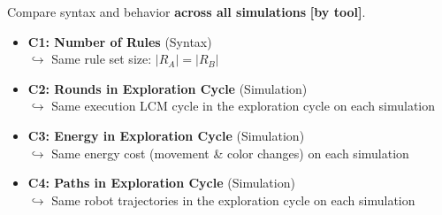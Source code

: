 \begin{frame}{}

\vspace{0.2cm}Compare syntax and behavior \textbf{across all simulations }\textbf{\textcolor{accent}{\scriptsize [by tool]}}.
\vspace{0.4cm}

\begin{itemize}\small\setlength\itemsep{0.15cm}
    \item<1-> \textbf{C1: Number of Rules} \textcolor{softgray}{\scriptsize (Syntax)}\\
              \textcolor{accent}{\scriptsize $\hookrightarrow$ Same rule set size: $|R_A| = |R_B|$}
              
    \item<2-> \textbf{C2: Rounds in Exploration Cycle} \textcolor{softgray}{\scriptsize (Simulation)}\\
              \textcolor{accent}{\scriptsize $\hookrightarrow$ Same execution LCM cycle in the exploration cycle on each simulation}
              
    \item<3-> \textbf{C3: Energy in Exploration Cycle} \textcolor{softgray}{\scriptsize (Simulation)}\\
              \textcolor{accent}{\scriptsize $\hookrightarrow$ Same energy cost (movement \& color changes) on each simulation}
              
    \item<4-> \textbf{C4: Paths in Exploration Cycle} \textcolor{softgray}{\scriptsize (Simulation)}\\
              \textcolor{accent}{\scriptsize $\hookrightarrow$ Same robot trajectories in the exploration cycle on each simulation}
\end{itemize}

\end{frame}


